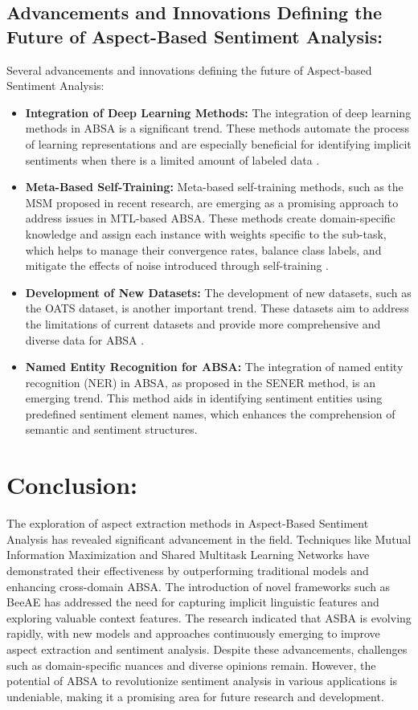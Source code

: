 \documentclass{article}
\begin{document}
\subsection{Advancements and Innovations Defining the Future of Aspect-Based Sentiment Analysis: }
Several advancements and innovations defining the future of Aspect-based Sentiment Analysis:
\begin{itemize}
    \item \textbf{Integration of Deep Learning Methods: } The integration of deep learning methods in ABSA is a significant trend. These methods automate the process of learning representations and are especially beneficial for identifying implicit sentiments when there is a limited amount of labeled data \cite{Madhoushi2023SemiSupervisedMF}.
    \item \textbf{Meta-Based Self-Training: } Meta-based self-training methods, such as the MSM proposed in recent research, are emerging as a promising approach to address issues in MTL-based ABSA. These methods create domain-specific knowledge and assign each instance with weights specific to the sub-task, which helps to manage their convergence rates, balance class labels, and mitigate the effects of noise introduced through self-training \cite{He2023MetaBasedSA}.
    \item \textbf{Development of New Datasets: } The development of new datasets, such as the OATS dataset, is another important trend. These datasets aim to address the limitations of current datasets and provide more comprehensive and diverse data for ABSA \cite{chebolu2023oats}.
    \item \textbf{Named Entity Recognition for ABSA: } The integration of named entity recognition (NER) in ABSA, as proposed in the SENER method, is an emerging trend. This method aids in identifying sentiment entities using predefined sentiment element names, which enhances the comprehension of semantic and sentiment structures\cite{Lee2023SENERSE}.
\end{itemize}


\section {Conclusion: }
The exploration of aspect extraction methods in Aspect-Based Sentiment Analysis has revealed significant advancement in the field. Techniques like Mutual Information Maximization and Shared Multitask Learning Networks have demonstrated their effectiveness by outperforming traditional models and enhancing cross-domain ABSA. The introduction of novel frameworks such as BeeAE has addressed the need for capturing implicit linguistic features and exploring valuable context features. The research indicated that ASBA is evolving rapidly, with new models and approaches continuously emerging to improve aspect extraction and sentiment analysis. Despite these advancements, challenges such as domain-specific nuances and diverse opinions remain. However, the potential of ABSA to revolutionize sentiment analysis in various applications is undeniable, making it a promising area for future research and development.


\end{document}
